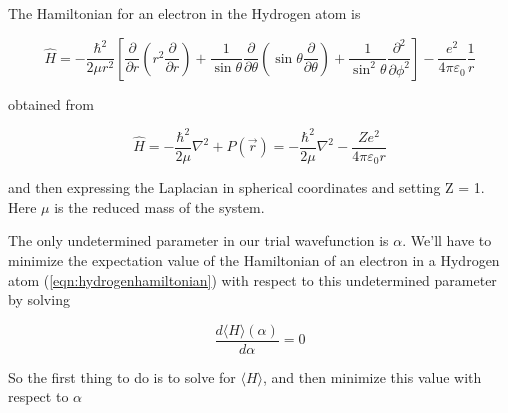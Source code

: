 

    The Hamiltonian for an electron in the Hydrogen atom is 

    \begin{equation}
        \label{eqn:hydrogenhamiltonian}
        \hat{H} = -\frac{\hbar^2}{2\mu r^2} \left[\frac{\partial}{\partial r}\left(r^2\frac{\partial}{\partial r}\right) + \frac{1}{\sin \theta}\frac{\partial}{\partial\theta}\left(\sin\theta \frac{\partial}{\partial \theta}\right) + \frac{1}{\sin^2\theta}\frac{\partial^2}{\partial \phi^2} \right] - \frac{e^2}{4\pi\varepsilon_0}\frac{1}{r}
    \end{equation}

    obtained from 

    \begin{equation*}
        \hat H = -\frac{\hbar^2}{2\mu}\nabla^2 + P(\vec r) = -\frac{\hbar^2}{2\mu}\nabla^2 - \frac{Ze^2}{4\pi\varepsilon_0 r}
    \end{equation*}

    and then expressing the Laplacian in spherical coordinates and setting Z = 1. Here $\mu$ is the reduced mass of the system.
    
    The only undetermined parameter in our trial wavefunction is $\alpha$. We'll have to minimize the expectation value of the Hamiltonian of an electron in a Hydrogen atom (\ref{eqn:hydrogenhamiltonian}) with respect to this undetermined parameter by solving 

    \begin{equation}
        \label{eqn:variational}
        \frac{d\langle H \rangle(\alpha)}{d\alpha} = 0
    \end{equation}

    So the first thing to do is to solve for $\langle H \rangle$, and then minimize this value with respect to $\alpha$

